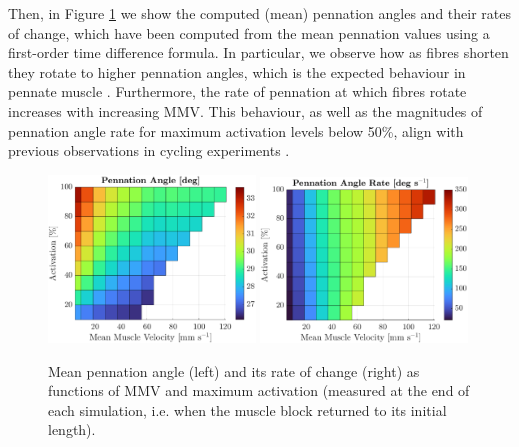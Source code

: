 \documentclass{sfuthesis}
\numberwithin{equation}{section}
\numberwithin{figure}{chapter}
\numberwithin{table}{chapter}
\theoremstyle{definition}
\begin{document}
Then, in Figure \ref{fig:g_pennation} we show the computed (mean) pennation angles and their rates of change, which have been computed from the mean pennation values using a first-order time difference formula. In particular, we observe how as fibres shorten they rotate to higher pennation angles, which is the expected behaviour in pennate muscle \cite{Eng2018,MaganarisEtAl1998,Muhl1982,ZuurbierHuijing1992}. Furthermore, the rate of pennation at which fibres rotate increases with increasing MMV. This behaviour, as well as the magnitudes of pennation angle rate for maximum activation levels below 50\%, align with previous observations in cycling experiments \cite{DickWakeling2017ShiftingGears}.

\begin{figure}
    \centering
    \includegraphics[width=0.49\textwidth]{12_vmuscle_activation_pennation.eps}
    \includegraphics[width=0.49\textwidth]{13_vmuscle_activation_ratepennation.eps}
    \caption{Mean pennation angle (left) and its rate of change (right) as functions of MMV and maximum activation (measured at the end of each simulation, i.e. when the muscle block returned to its initial length).
    \label{fig:g_pennation}}
\end{figure}
\end{document}
